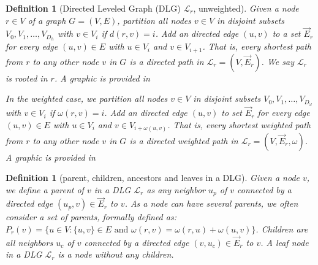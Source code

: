 \documentclass[11pt]{article}
\newtheorem{definition}[theorem]{Definition}
\newcommand{\calL}{\mathcal{L}}
\newif\iffull
\newif\ifshort
\begin{document}
\begin{definition}[Directed Leveled Graph (DLG) $\calL_r$, unweighted]
 Given a node $r\in V$ of a graph $G=(V,E)$, partition all nodes $v\in V$ in disjoint subsets $V_0,V_1,\dots,V_{D_h}$ with $v\in V_i$ if $d(r,v)=i$. Add an directed edge $(u,v)$ to a set $\vec E_r$ for every edge $(u,v)\in E$ with $u\in V_i$ and $v\in V_{i+1}$.
That is, every shortest path from $r$ to any other node $v$ in $G$ is a directed path in $\calL_r=(V,\vec E_r)$. We say $\calL_r$ is rooted in $r$.
A graphic is provided in 
\ifshort
Appendix \ref{FULL:sec:model}, Figure \ref{FULL:abb:leveledgraph}.
\fi
\iffull
Figure \ref{abb:leveledgraph}.
\fi

In the weighted case, we partition all nodes $v\in V$ in disjoint subsets $V_0,V_1,\dots,V_{D_\omega}$ with $v\in V_i$ if $\omega(r,v)=i$. Add an directed edge $(u,v)$ to set $\vec E_r$ for every edge $(u,v)\in E$ with $u\in V_i$ and $v\in V_{i+\omega(u,v)}$.
That is, every shortest weighted path from $r$ to any other node $v$ in $G$ is a directed weighted path in $\calL_r=(V,\vec E_r,\omega)$. 
A graphic is provided in 
\ifshort
Appendix \ref{FULL:sec:model}, Figure \ref{FULL:abb:leveledgraphweighted}.
\fi
\iffull
Figure \ref{abb:leveledgraphweighted}.
\fi

\end{definition}
\iffull
\begin{figure}[htb]
\begin{center}
\texttt{[image: graphLs\_sets]}
\caption{$G=(V,E)$ on the left side and its leveled graph $\calL_r$ rooted in $r$ on the right.}\label{abb:leveledgraph}
\end{center}
\end{figure}
\begin{figure}[htb]
\begin{center}
\texttt{[image: graph\_weighted\_Ls-sets]}
\caption{$G=(V,E,\omega)$ on the left side and its leveled graph $\calL_r$ rooted in $r$ on the right}\label{abb:leveledgraphweighted}
\end{center}
\end{figure}
\fi

\begin{definition}[parent, children, ancestors and leaves  in a DLG]
 Given a node $v$, we define a parent of $v$ in  a DLG $\calL_r$ as any neighbor $u_p$ of $v$ connected by a directed edge $(u_p,v)\in \vec E_r$ to $v$. As a node can have several parents, we often consider a set of parents, formally defined as: $P_r(v)=\{u\in V:\{u,v\}\in E \text{ and } \omega(r,v)=\omega(r,u)+\omega(u,v)\}$. Children are all neighbors $u_c$ of $v$ connected by a directed edge $(v,u_c)\in \vec E_r$ to $v$. A leaf node in a DLG $\calL_r$ is a node without any children.
\end{definition}
\end{document}
